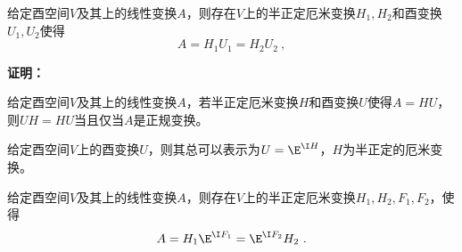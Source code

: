 
\begin{theorem}{}
给定酉空间$V$及其上的线性变换$A$，则存在$V$上的半正定厄米变换$H_1,H_2$和酉变换$U_1,U_2$使得
\begin{equation}
A=H_1U_1=H_2U_2~,
\end{equation}
\end{theorem}
\textbf{证明：}
\begin{theorem}{}
给定酉空间$V$及其上的线性变换$A$，若半正定厄米变换$H$和酉变换$U$使得$A=HU$，则$UH=HU$当且仅当$A$是正规变换。
\end{theorem}
\begin{theorem}{}
给定酉空间$V$上的酉变换$U$，则其总可以表示为$U=\E^{\I H}$，$H$为半正定的厄米变换。
\end{theorem}
\begin{corollary}{}
给定酉空间$V$及其上的线性变换$A$，则存在$V$上的半正定厄米变换$H_1,H_2,F_1,F_2$，使得
\begin{equation}
A=H_1\E^{\I F_1}=\E^{\I F_2}H_2~.
\end{equation}
\end{corollary}
